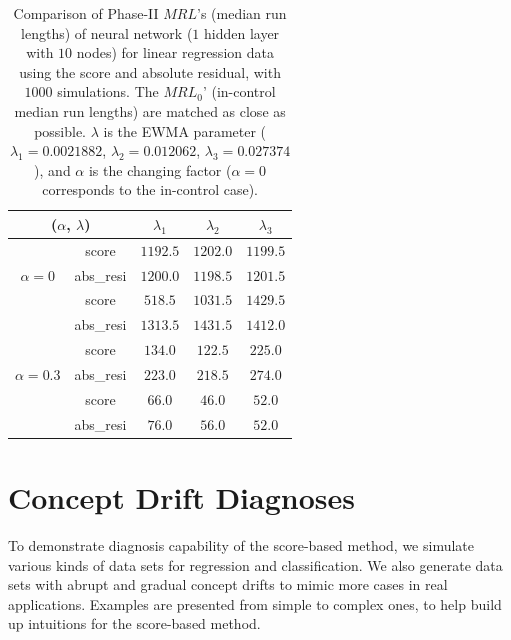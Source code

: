 \documentclass[twoside,11pt]{article}
\begin{document}
\begin{appendix}
\begin{table}[H]
\centering
\begin{tabular}{ccccc}
\toprule
\multicolumn{2}{c}{($ \alpha$, $ \lambda$)} & {$ \lambda_1$} & {$ \lambda_2$} & {$ \lambda_3$} \\
\midrule
\multirow{3}{*}{$\alpha=0$} & score &$1192.5$ & $1202.0$ & $1199.5$ \\
& abs\_resi &$1200.0$ & $1198.5$ & $1201.5$ \\
\midrule
\multirow{3}{*}{$\alpha=0.1$} & score &$\bm {518.5}$ & $\bm{1031.5}$ & $1429.5$ \\
& abs\_resi &$1313.5$ & $1431.5$ & $\bm{1412.0}$ \\
\midrule
\multirow{3}{*}{$\alpha=0.3$} & score &$\bm{134.0}$ & $\bm{122.5}$ & $\bm{225.0}$ \\
& abs\_resi &$223.0$ & $218.5$ & $274.0$ \\
\midrule
\multirow{3}{*}{$\alpha=0.5$} & score &$\bm{66.0}$ & $\bm{46.0}$ & ${52.0}$ \\
& abs\_resi &$76.0$ & $56.0$ & $52.0$ \\
\midrule
\end{tabular}
\caption{Comparison of Phase-II $MRL$'s (median run lengths) of neural network ($1$ hidden layer with $10$ nodes) for linear regression data using the score and absolute residual, with $1000$ simulations. The $MRL_0$' (in-control median run lengths) are matched as close as possible. $ \lambda$ is the EWMA parameter ({$ \lambda_1=0.0021882$}, {$ \lambda_2=0.012062$}, {$ \lambda_3=0.027374$}), and $ \alpha$ is the changing factor ($ \alpha=0$ corresponds to the in-control case).}
\label{tab:lin_nnet_MRL}
\end{table}


\section{Concept Drift Diagnoses}
\label{ss:cd_diag}
To demonstrate diagnosis capability of the score-based method, we simulate various kinds of data sets for regression and classification. We also generate data sets with abrupt and gradual concept drifts to mimic more cases in real applications. Examples are presented from simple to complex ones, to help build up intuitions for the score-based method.


\end{appendix}
\end{document}
